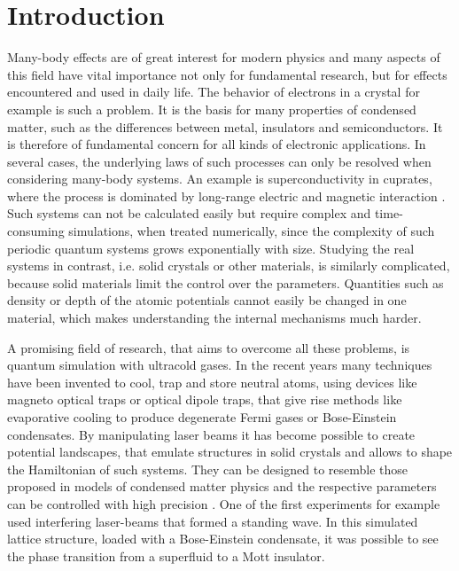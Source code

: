 \chapter{Introduction}

Many-body effects are of great interest for modern physics and many aspects of this field have vital importance not only for fundamental research, but for effects encountered and used in daily life. The behavior of electrons in a crystal for example is such a problem. It is the basis for many properties of condensed matter, such as the differences between metal, insulators and semiconductors. It is therefore of fundamental concern for all kinds of electronic applications. In several cases, the underlying laws of such processes can only be resolved when considering many-body systems. An example is superconductivity in cuprates, where the process is dominated by long-range electric and magnetic interaction \cite{cuprates}. Such systems can not be calculated easily but require complex and time-consuming simulations, when treated numerically, since the complexity of such periodic quantum systems grows exponentially with size\cite{feynman}. Studying the real systems in contrast, i.e. solid crystals or other materials, is similarly complicated, because solid materials limit the control over the parameters. Quantities such as density or depth of the atomic potentials cannot easily be changed in one material, which makes understanding the internal mechanisms much harder. 

A promising field of research, that aims to overcome all these problems, is quantum simulation with ultracold gases. In the recent years many techniques have been invented to cool, trap and store neutral atoms, using devices like magneto optical traps or optical dipole traps\cite{metcalf}, that give rise methods like evaporative cooling to produce degenerate Fermi gases or Bose-Einstein condensates. By manipulating laser beams it has become possible to create potential landscapes, that emulate structures in solid crystals and allows to shape the Hamiltonian of such systems. They can be designed to resemble those proposed in models of condensed matter physics and the respective parameters can be controlled with high precision \cite{bloch}. One of the first experiments for example used interfering laser-beams that formed a standing wave. In this simulated lattice structure, loaded with a Bose-Einstein condensate, it was possible to see the phase transition from a superfluid to a Mott insulator\cite{greiner}.

